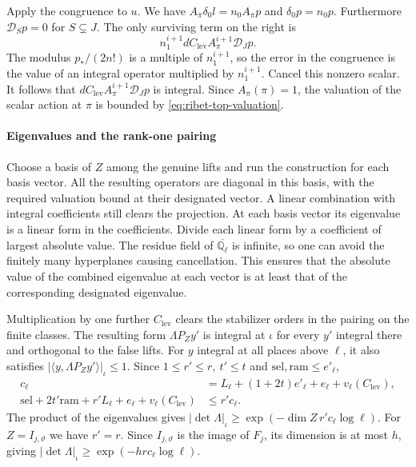 Apply the congruence to \(u\). We have
\(A_\pi\delta_0l=n_0 A_\pi p\) and \(\delta_0p=n_0p\).
Furthermore \(\mathcal D_Sp=0\) for \(S\subsetneq J\). The
only surviving term on the right is
\[
 n_1^{i+1}d C_{\mathrm{lev}} A_\pi^{i+1}\mathcal D_J p .
\]
The modulus \(p_\ast/(2n!)\) is a multiple of \(n_1^{i+1}\),
so the error in the congruence is the value of an integral
operator multiplied by \(n_1^{i+1}\). Cancel this nonzero scalar.
It follows that \(d C_{\mathrm{lev}} A_\pi^{i+1}\mathcal D_Jp\)
is integral. Since \(A_\pi(\pi)=1\), the valuation of the scalar
action at \(\pi\) is bounded by \eqref{eq:ribet-top-valuation}.

\paragraph{Eigenvalues and the rank-one pairing}
Choose a basis of \(Z\) among the genuine lifts and run the
construction for each basis vector. All the resulting operators
are diagonal in this basis, with the required valuation bound
at their designated vector. A linear combination with integral
coefficients still clears the projection. At each basis vector
its eigenvalue is a linear form in the coefficients. Divide
each linear form by a coefficient of largest absolute value.
The residue field of \(\overline{\mathbb Q_\ell}\) is infinite,
so one can avoid the finitely many hyperplanes causing cancellation. This ensures that the
absolute value of the combined eigenvalue at each vector is at
least that of the corresponding designated eigenvalue.

Multiplication by one further \(C_{\mathrm{lev}}\) clears the
stabilizer orders in the pairing on the finite classes. The
resulting form \(\Lambda P_Zy'\) is integral at \(\iota\) for
every \(y'\) integral there and orthogonal to the false lifts.
For \(y\) integral at all places above \(\ell\), it also satisfies
\(|\langle y,\Lambda P_Zy'\rangle|_\iota\le1\).
Since \(1\le r'\le r,\ t'\le t\) and \(\mathrm{sel},\mathrm{ram}\le e'_\ell\),
\[
 \begin{split}
 c_\ell&=L_\ell+(1+2t)e'_\ell+e_\ell+v_\ell(C_{\mathrm{lev}}),\\
 \mathrm{sel}+2t'\mathrm{ram}+r'L_\ell+e_\ell+v_\ell(C_{\mathrm{lev}})
      &\le r'c_\ell .
 \end{split}
\]
The product of the eigenvalues gives
\(|\det\Lambda|_\iota\ge \exp(-\dim Z\,r'c_\ell\log\ell)\).
For \(Z=I_{j,\vartheta}\) we have \(r'=r\).
Since \(I_{j,\vartheta}\) is the image of \(F_j\), its dimension is
at most \(h\), giving \(|\det\Lambda|_\iota\ge\exp(-hrc_\ell\log\ell)\).

